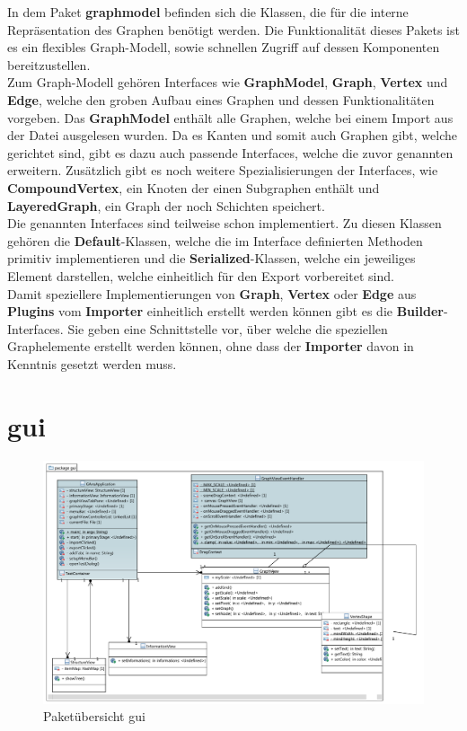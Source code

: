 In dem Paket \textbf{graphmodel} befinden sich die Klassen, die für die interne Repräsentation des Graphen benötigt werden. Die Funktionalität dieses Pakets ist es ein flexibles Graph-Modell, sowie schnellen Zugriff auf dessen Komponenten bereitzustellen.\\ 
Zum Graph-Modell gehören Interfaces wie \textbf{GraphModel}, \textbf{Graph}, \textbf{Vertex} und \textbf{Edge}, welche den groben Aufbau eines Graphen und dessen Funktionalitäten vorgeben. Das \textbf{GraphModel} enthält alle Graphen, welche bei einem Import aus der Datei ausgelesen wurden. Da es Kanten und somit auch Graphen gibt, welche gerichtet sind, gibt es dazu auch passende Interfaces, welche die zuvor genannten erweitern. Zusätzlich gibt es noch weitere Spezialisierungen der Interfaces, wie \textbf{CompoundVertex}, ein Knoten der einen Subgraphen enthält und \textbf{LayeredGraph}, ein Graph der noch Schichten speichert.\\
Die genannten Interfaces sind teilweise schon implementiert. Zu diesen Klassen gehören die \textbf{Default}-Klassen, welche die im Interface definierten Methoden primitiv implementieren und die \textbf{Serialized}-Klassen, welche ein jeweiliges Element darstellen, welche einheitlich für den Export vorbereitet sind. \\
Damit speziellere Implementierungen von \textbf{Graph}, \textbf{Vertex} oder \textbf{Edge} aus \textbf{Plugins} vom \textbf{Importer} einheitlich erstellt werden können gibt es die \textbf{Builder}-Interfaces. Sie geben eine Schnittstelle vor, über welche die speziellen Graphelemente erstellt werden können, ohne dass der \textbf{Importer} davon in Kenntnis gesetzt werden muss.

\newpage

\section{gui}

\begin{figure}[hb]
  \centering
  \includegraphics[width=380pt]{resourcen/gui.pdf}
  \caption{Paketübersicht gui}
  \label{fig:packge_gui}
\end{figure}

